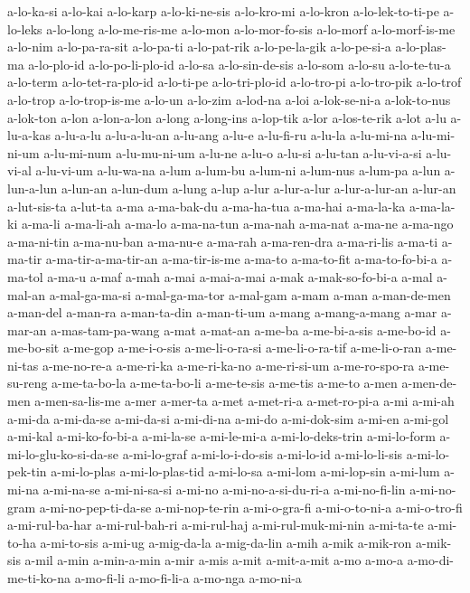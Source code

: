 {a-lo-ka-si a-lo-kai a-lo-karp a-lo-ki-ne-sis a-lo-kro-mi a-lo-kron
a-lo-lek-to-ti-pe a-lo-leks a-lo-long a-lo-me-ris-me a-lo-mon
a-lo-mor-fo-sis a-lo-morf a-lo-morf-is-me a-lo-nim a-lo-pa-ra-sit
a-lo-pa-ti a-lo-pat-rik a-lo-pe-la-gik a-lo-pe-si-a a-lo-plas-ma
a-lo-plo-id a-lo-po-li-plo-id a-lo-sa a-lo-sin-de-sis a-lo-som a-lo-su
a-lo-te-tu-a a-lo-term a-lo-tet-ra-plo-id a-lo-ti-pe a-lo-tri-plo-id
a-lo-tro-pi a-lo-tro-pik a-lo-trof a-lo-trop a-lo-trop-is-me a-lo-un
a-lo-zim a-lod-na a-loi a-lok-se-ni-a a-lok-to-nus a-lok-ton a-lon
a-lon-a-lon a-long a-long-ins a-lop-tik a-lor a-los-te-rik a-lot a-lu
a-lu-a-kas a-lu-a-lu a-lu-a-lu-an a-lu-ang a-lu-e a-lu-fi-ru a-lu-la
a-lu-mi-na a-lu-mi-ni-um a-lu-mi-num a-lu-mu-ni-um a-lu-ne a-lu-o a-lu-si
a-lu-tan a-lu-vi-a-si a-lu-vi-al a-lu-vi-um a-lu-wa-na a-lum a-lum-bu
a-lum-ni a-lum-nus a-lum-pa a-lun a-lun-a-lun a-lun-an a-lun-dum a-lung
a-lup a-lur a-lur-a-lur a-lur-a-lur-an a-lur-an a-lut-sis-ta a-lut-ta a-ma
a-ma-bak-du a-ma-ha-tua a-ma-hai a-ma-la-ka a-ma-la-ki a-ma-li a-ma-li-ah
a-ma-lo a-ma-na-tun a-ma-nah a-ma-nat a-ma-ne a-ma-ngo a-ma-ni-tin
a-ma-nu-ban a-ma-nu-e a-ma-rah a-ma-ren-dra a-ma-ri-lis a-ma-ti a-ma-tir
a-ma-tir-a-ma-tir-an a-ma-tir-is-me a-ma-to a-ma-to-fit a-ma-to-fo-bi-a
a-ma-tol a-ma-u a-maf a-mah a-mai a-mai-a-mai a-mak a-mak-so-fo-bi-a a-mal
a-mal-an a-mal-ga-ma-si a-mal-ga-ma-tor a-mal-gam a-mam a-man a-man-de-men
a-man-del a-man-ra a-man-ta-din a-man-ti-um a-mang a-mang-a-mang a-mar
a-mar-an a-mas-tam-pa-wang a-mat a-mat-an a-me-ba a-me-bi-a-sis a-me-bo-id
a-me-bo-sit a-me-gop a-me-i-o-sis a-me-li-o-ra-si a-me-li-o-ra-tif
a-me-li-o-ran a-me-ni-tas a-me-no-re-a a-me-ri-ka a-me-ri-ka-no
a-me-ri-si-um a-me-ro-spo-ra a-me-su-reng a-me-ta-bo-la a-me-ta-bo-li
a-me-te-sis a-me-tis a-me-to a-men a-men-de-men a-men-sa-lis-me a-mer
a-mer-ta a-met a-met-ri-a a-met-ro-pi-a a-mi a-mi-ah a-mi-da a-mi-da-se
a-mi-da-si a-mi-di-na a-mi-do a-mi-dok-sim a-mi-en a-mi-gol a-mi-kal
a-mi-ko-fo-bi-a a-mi-la-se a-mi-le-mi-a a-mi-lo-deks-trin a-mi-lo-form
a-mi-lo-glu-ko-si-da-se a-mi-lo-graf a-mi-lo-i-do-sis a-mi-lo-id
a-mi-lo-li-sis a-mi-lo-pek-tin a-mi-lo-plas a-mi-lo-plas-tid a-mi-lo-sa
a-mi-lom a-mi-lop-sin a-mi-lum a-mi-na a-mi-na-se a-mi-ni-sa-si a-mi-no
a-mi-no-a-si-du-ri-a a-mi-no-fi-lin a-mi-no-gram a-mi-no-pep-ti-da-se
a-mi-nop-te-rin a-mi-o-gra-fi a-mi-o-to-ni-a a-mi-o-tro-fi a-mi-rul-ba-har
a-mi-rul-bah-ri a-mi-rul-haj a-mi-rul-muk-mi-nin a-mi-ta-te a-mi-to-ha
a-mi-to-sis a-mi-ug a-mig-da-la a-mig-da-lin a-mih a-mik a-mik-ron
a-mik-sis a-mil a-min a-min-a-min a-mir a-mis a-mit a-mit-a-mit a-mo
a-mo-a a-mo-di-me-ti-ko-na a-mo-fi-li a-mo-fi-li-a a-mo-nga a-mo-ni-a
}
